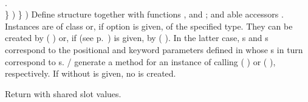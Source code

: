 \begin{LIST}{1cm}
{{{{          \\
        }{.}\\
      }{\}}%
      )%
    }{\}}
    )}
  {
    Define structure  together with functions
    ,  and
    ; and able accessors
    \LIT{-}. Instances are of class  or, if 
     option  is given, of the specified type.
    They can be
    created by ( ) or, if  (see
    p.\ \pageref{section:Functions}) is given, by (
     ). In the latter
    case, s and \kwd{:}s correspond to the positional
    and keyword parameters defined in  whose
    s in turn correspond to s.
    / generate a
     method for an instance  of 
    calling (  ) or (
      ), respectively.
    If  without  is given, no 
    is created.
}

  {
    Return  with shared slot values.
  }

\end{LIST}



